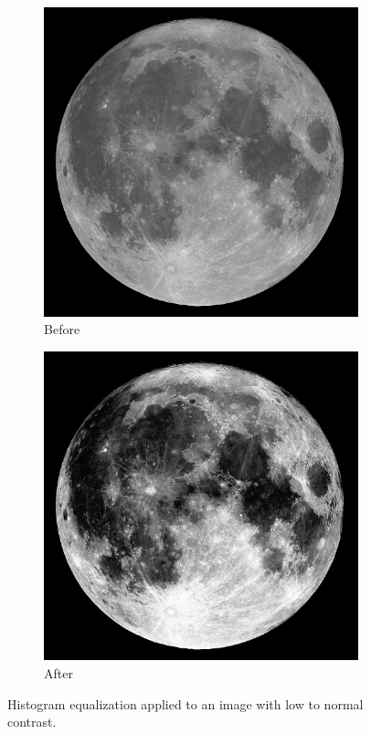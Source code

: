 \documentclass[11pt,a4paper]{article}
\begin{document}
\clearpage

\begin{figure}[ht]
	\centering
	\begin{subfigure}[h]{0.45\textwidth}
		\includegraphics[width=\textwidth]{figs/lc3_gray}
		\caption{Before}
		\label{fig:moon_bef}
	\end{subfigure}
	\begin{subfigure}[h]{0.45\textwidth}
		\includegraphics[width=\textwidth]{figs/lc3_ce}
		\caption{After}
		\label{fig:moon_aft}
	\end{subfigure}	
	
	\caption{Histogram equalization applied to an image with low to normal contrast.}
	\label{fig:ce_norm_moon}
\end{figure}
\end{document}
